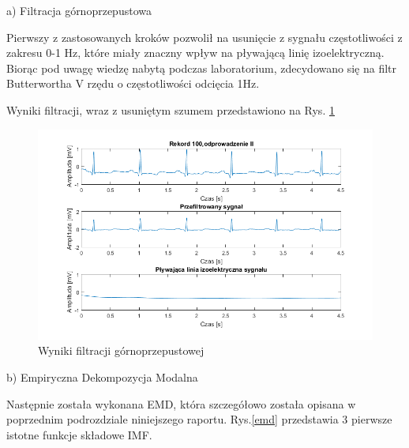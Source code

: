 \documentclass[10pt,a4paper]{article}
\begin{document}
\vspace{1em}

a) Filtracja górnoprzepustowa

Pierwszy z zastosowanych kroków pozwolił na usunięcie z sygnału częstotliwości z
zakresu 0-1 Hz, które miały znaczny wpływ na pływającą linię izoelektryczną. Biorąc
pod uwagę wiedzę nabytą podczas laboratorium, zdecydowano się na filtr Butterwortha V rzędu
o częstotliwości odcięcia 1Hz.

\vspace{1em}

Wyniki filtracji, wraz z usuniętym szumem przedstawiono na Rys. \ref{filtracja}

\vspace{1em}

\begin{figure}[h!]
\label{filtracja}
	\centerline{\includegraphics[scale=0.9]{pierwszy}}
	\caption{Wyniki filtracji górnoprzepustowej}
\end{figure}
\FloatBarrier

\vspace{1em}

b) Empiryczna Dekompozycja Modalna

Następnie została wykonana EMD, która szczegółowo została opisana w poprzednim podrozdziale
niniejszego raportu. Rys.\ref{emd} przedstawia 3 pierwsze istotne funkcje składowe IMF.

\vspace{1em}
\end{document}
